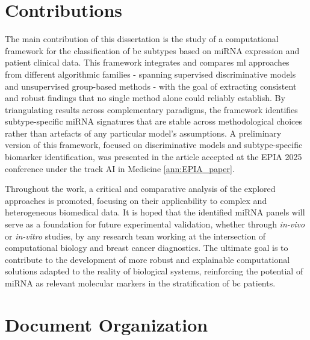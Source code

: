\section{Contributions}
\label{sec:contributions}
The main contribution of this dissertation is the study of a computational
framework for the classification of \gls{bc} subtypes based
on miRNA expression and patient clinical data. This
framework integrates and compares \gls{ml} approaches from different algorithmic
families - spanning supervised discriminative models and unsupervised 
group-based methods - with the goal of extracting consistent and robust 
findings that no single method alone could reliably establish. By triangulating
results across complementary paradigms, the framework identifies
subtype-specific miRNA signatures that are stable across methodological
choices rather than artefacts of any particular model's assumptions.
A preliminary version of this framework, focused on discriminative models and
subtype-specific biomarker identification, was presented in the article accepted
at the EPIA 2025 conference under the track AI in Medicine \ref{ann:EPIA_paper}.

Throughout the work, a critical and comparative analysis of the explored
approaches is promoted, focusing on their applicability to complex and
heterogeneous biomedical data. It is hoped that the identified miRNA 
panels will serve as a foundation for future experimental validation, whether 
through \textit{in-vivo} or \textit{in-vitro} studies, by any research team 
working at the intersection of computational biology and breast cancer 
diagnostics. The ultimate goal is to contribute to the development of more 
robust and explainable computational solutions adapted to the reality of 
biological systems, reinforcing the potential of miRNA as relevant 
molecular markers in the stratification of \gls{bc} patients.

\section{Document Organization}
\label{sec:document-organization}

